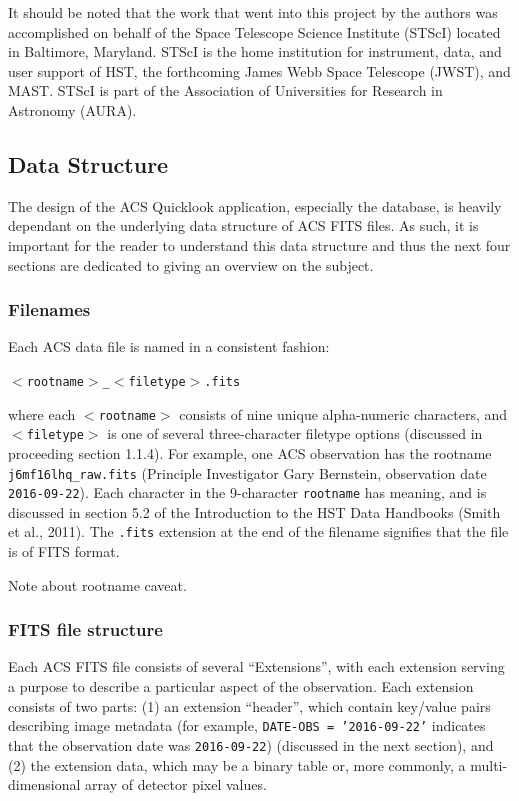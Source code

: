 \documentclass[10pt,journal,compsoc]{IEEEtran}
\begin{document}
It should be noted that the work that went into this project by the authors was
accomplished on behalf of the Space Telescope Science Institute (STScI) located in
Baltimore, Maryland.  STScI is the home institution for instrument, data, and user
support of HST, the forthcoming James Webb Space Telescope
(JWST), and MAST.  STScI is part of the Association of Universities for Research in
Astronomy (AURA).


\subsection{Data Structure}

The design of the ACS Quicklook application, especially the database, is heavily
dependant on the underlying data structure of ACS FITS files.  As such, it is
important for the reader to understand this data structure and thus the next four
sections are dedicated to giving an overview on the subject.

\subsubsection{Filenames}

Each ACS data file is named in a consistent fashion:\newline

\texttt{$<$rootname$>$\_$<$filetype$>$.fits}\newline

\noindent where each \texttt{$<$rootname$>$} consists of nine unique alpha-numeric
characters, and \texttt{$<$filetype$>$} is one of several three-character filetype options
(discussed in proceeding section 1.1.4).  For example, one ACS observation has the rootname
\texttt{j6mf16lhq\_raw.fits} (Principle Investigator Gary Bernstein, observation
date \texttt{2016-09-22}).  Each character in the 9-character \texttt{rootname}
has meaning, and is discussed in section 5.2 of the Introduction to the HST
Data Handbooks (Smith et al., 2011).  The \texttt{.fits} extension at the end
of the filename signifies that the file is of FITS format.

Note about rootname caveat.

\subsubsection{FITS file structure}

Each ACS FITS file consists of several ``Extensions'', with each extension serving a purpose
to describe a particular aspect of the observation.  Each extension consists of two parts: (1)
an extension ``header'', which contain key/value pairs describing image metadata (for example,
\texttt{DATE-OBS = '2016-09-22'} indicates that the observation date was \texttt{2016-09-22})
(discussed in the next section), and (2) the extension data, which may be a binary table or,
more commonly, a multi-dimensional array of detector pixel values.
\end{document}
